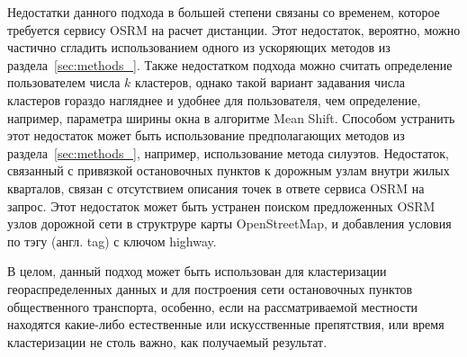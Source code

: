 Недостатки данного подхода в большей степени связаны со временем, которое требуется сервису OSRM на расчет дистанции. Этот недостаток, вероятно, можно частично сгладить использованием одного из ускоряющих методов из раздела~\ref{sec:methods_}. Также недостатком подхода можно считать определение пользователем числа \( k \) кластеров, однако такой вариант задавания числа кластеров гораздо нагляднее и удобнее для пользователя, чем определение, например, параметра ширины окна в алгоритме Mean Shift. Способом устранить этот недостаток может быть использование предполагающих методов из раздела~\ref{sec:methods_}, например, использование метода силуэтов. Недостаток, связанный с привязкой остановочных пунктов к дорожным узлам внутри жилых кварталов, связан с отсутствием описания точек в ответе сервиса OSRM на запрос. Этот недостаток может быть устранен поиском предложенных OSRM узлов дорожной сети в структруре карты OpenStreetMap, и добавления условия по тэгу (англ. tag) с ключом highway.

В целом, данный подход может быть использован для кластеризации геораспределенных данных и для построения сети остановочных пунктов общественного транспорта, особенно, если на рассматриваемой местности находятся какие-либо естественные или искусственные препятствия, или время кластеризации не столь важно, как получаемый результат.
